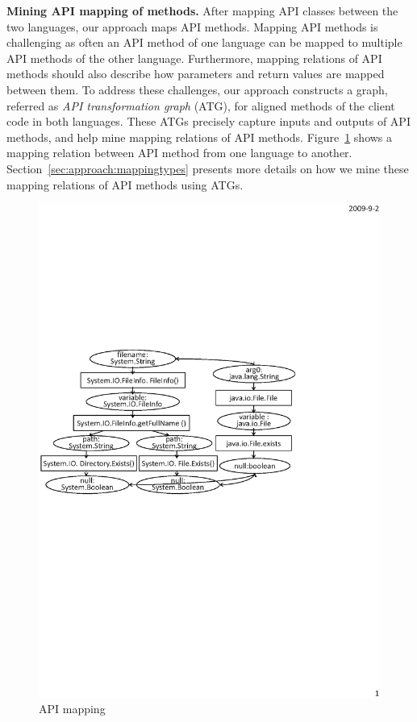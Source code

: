 \textbf{Mining API mapping of methods.} After mapping API classes
between the two languages, our approach maps API methods. Mapping
API methods is challenging as often an API method of one language
can be mapped to multiple API methods of the other language.
Furthermore, mapping relations of API methods should also describe
how parameters and return values are mapped between them. To address
these challenges, our approach constructs a graph, referred as
\emph{API transformation graph} (ATG), for aligned methods of the
client code in both languages. These ATGs precisely capture inputs
and outputs of API methods, and help mine mapping relations of API
methods. Figure~\ref{fig:example} shows a mapping relation between
API method  from one language to another.
Section~\ref{sec:approach:mappingtypes} presents more details on how
we mine these mapping relations of API methods using ATGs.

\begin{figure}[t]
\centering
\includegraphics[scale=0.65,clip]{figure/sample.eps}\vspace*{-3ex}
 \caption{\label{fig:example}API mapping}\vspace*{-3ex}
\end{figure}

